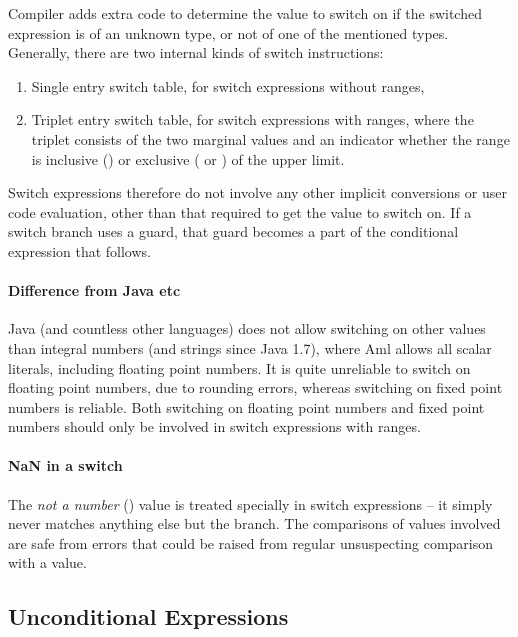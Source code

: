 Compiler adds extra code to determine the value to switch on if the switched expression is of an unknown type, or not of one of the mentioned types. Generally, there are two internal kinds of switch instructions:
\begin{enumerate}
  \item Single entry switch table, for switch expressions without ranges,
  \item Triplet entry switch table, for switch expressions with ranges, where the triplet consists of the two marginal values and an indicator whether the range is inclusive () or exclusive ( or ) of the upper limit. 
\end{enumerate}

Switch expressions therefore do not involve any other implicit conversions or user code evaluation, other than that required to get the value to switch on. If a switch branch uses a guard, that guard becomes a part of the conditional expression that follows. 

\paragraph{Difference from Java etc}
Java (and countless other languages) does not allow switching on other values than integral numbers (and strings since Java 1.7), where Aml allows all scalar literals, including floating point numbers. It is quite unreliable to switch on floating point numbers, due to rounding errors, whereas switching on fixed point numbers is reliable. Both switching on floating point numbers and fixed point numbers should only be involved in switch expressions with ranges. 

\paragraph{NaN in a switch}
The {\em not a number} () value is treated specially in switch expressions -- it simply never matches anything else but the  branch. The comparisons of values involved are safe from errors that could be raised from regular unsuspecting comparison with a  value. 






\subsection{Unconditional Expressions}

